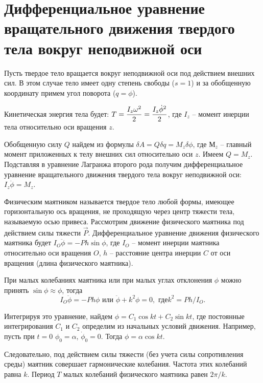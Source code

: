 \section{Дифференциальное уравнение вращательного движения твердого тела вокруг
неподвижной оси}
Пусть твердое тело вращается вокруг неподвижной оси под действием внешних сил. В
этом случае тело имеет одну степень свободы (\( s = 1 \)) и за обобщенную
координату примем угол поворота (\( q = \phi \)).

Кинетическая энергия тела будет:
\( \displaystyle T = \frac{I_z\omega^2}{2} = \frac{I_z\dot{\phi}^2}{2} \), 
где \( I_z \) -- момент инерции тела относительно оси вращения \( z \).

Обобщенную силу \( Q \) найдем из формулы
\( \delta A = Q\delta q = M_z\delta\phi \), где \( М_z \) -- главный момент
приложенных к телу внешних сил относительно оси \( z \). Имеем \( Q = M_z \).
Подставляя в уравнение Лагранжа второго рода получим дифференциальное уравнение
вращательного движения твердого тела вокруг неподвижной оси:
\( I_z\ddot{\phi} = M_z \).

Физическим маятником называется твердое тело любой формы, имеющее горизонтальную
ось вращения, не проходящую через центр тяжести тела, называемую осью привеса.
Рассмотрим движение физического маятника под действием силы тяжести
\( \vec{P} \). Дифференциальное уравнение движения физического маятника будет
\( I_O\ddot{\phi} = -Ph\sin\phi \), где \( I_O \) -- момент инерции маятника
относительно оси вращения \( O \), \( h \) -- расстояние центра инерции \( C \)
от оси вращения (длина физического маятника).

При малых колебаниях маятника или при малых углах отклонения \( \phi \) можно
принять \( \sin\phi \approx \phi \), тогда
\[
    I_O\ddot{\phi} = -Ph\phi \text{ или } \ddot{\phi} + k^2\phi = 0, \text{ где}
    k^2 = Ph/I_O.
\]

Интегрируя это уравнение, найдем \( \phi = C_1\cos kt + C_2\sin kt \), где
постоянные интегрирования \( C_1 \) и \( C_2 \) определим из начальных условий
движения. Например, пусть при \( t = 0 \) \( \phi_0 = \alpha \),
\( \dot{\phi}_0 = 0 \). Тогда \( \phi =\alpha\cos kt \).

Следовательно, под действием силы тяжести (без учета силы сопротивления среды)
маятник совершает гармонические колебания. Частота этих колебаний равна \( k \).  
Период \( T \) малых колебаний физического маятника равен \( 2\pi/k \).

\newpage
